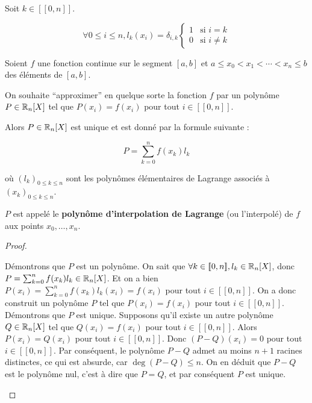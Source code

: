 \documentclass[12pt, a4paper]{report}
\begin{document}
\begin{remark}
    Soit $k \in [\![0,n]\!]$.

    $$\forall 0 \le i \le n, l_k(x_i) = \delta_{i,k} \begin{cases}1 & \text{si } i = k\\0 & \text{si } i \ne k\end{cases}$$
\end{remark}

\begin{theorem}
    Soient $f$ une fonction continue sur le segment $[a,b]$ et $a \le x_0 < x_1 < \cdots < x_n \le b$ des éléments de $[a,b]$.

    On souhaite ``approximer'' en quelque sorte la fonction $f$ par un polynôme $P \in \mathbb{R}_n[X]$ tel que $P(x_i) = f(x_i)$ pour tout $i \in [\![0,n]\!]$.

    Alors $P \in \mathbb{R}_n[X]$ est unique et est donné par la formule suivante :

    $$P = \sum_{k=0}^{n} f(x_k) l_k$$

    où $(l_k)_{0 \le k \le n}$ sont les polynômes élémentaires de Lagrange associés à $(x_k)_{0 \le k \le n}$.

    $P$ est appelé le \textbf{polynôme d'interpolation de Lagrange} (ou l'interpolé) de $f$ aux points $x_0,\dots,x_n$.
\end{theorem}

\begin{proof}
    \begin{outline}
        \1 Démontrons que $P$ est un polynôme.
            \2 On sait que $\forall k \in [\![0,n]\!], l_k \in \mathbb{R}_n[X]$, donc $P = \sum_{k=0}^{n}f(x_k) l_k \in \mathbb{R}_n[X]$.
            \2 Et on a bien $P(x_i) = \sum_{k=0}^{n} f(x_k) l_k(x_i) = f(x_i)$ pour tout $i \in [\![0,n]\!]$.
            \2 On a donc construit un polynôme $P$ tel que $P(x_i) = f(x_i)$ pour tout $i \in [\![0,n]\!]$.
        \1 Démontrons que $P$ est unique.
            \2 Supposons qu'il existe un autre polynôme $Q \in \mathbb{R}_n[X]$ tel que $Q(x_i) = f(x_i)$ pour tout $i \in [\![0,n]\!]$.
            \2 Alors $P(x_i) = Q(x_i)$ pour tout $i \in [\![0,n]\!]$.
            \2 Donc $(P-Q)(x_i) = 0$ pour tout $i \in [\![0,n]\!]$.
            \2 Par conséquent, le polynôme $P-Q$ admet au moins $n+1$ racines distinctes, ce qui est absurde, car $\deg(P-Q) \le n$.
            \2 On en déduit que $P-Q$ est le polynôme nul, c'est à dire que $P=Q$, et par conséquent $P$ est unique.
    \end{outline}
\end{proof}
\end{document}
